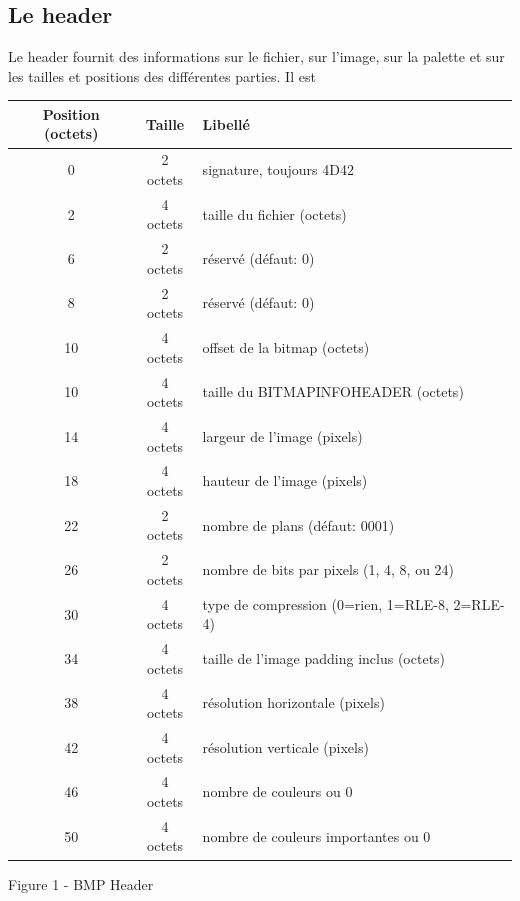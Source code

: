 \documentclass{article}
\begin{document}
		
		\subsection{Le header}
			Le header fournit des informations sur le fichier, sur l'image, sur la palette et sur les tailles et positions des différentes parties. Il est
			\begin{center}\begin{tabular}{|c|c|l|}
				\hline \textbf{Position (octets)} & \textbf{Taille} & \textbf{Libellé}\\
				\hline 0  & 2 octets & signature, toujours 4D42\\
				\hline 2  & 4 octets & taille du fichier (octets)\\
				\hline 6  & 2 octets & réservé (défaut: 0)\\
				\hline 8  & 2 octets & réservé (défaut: 0)\\
				\hline 10 & 4 octets & offset de la bitmap (octets)\\
				\hline 10 & 4 octets & taille du BITMAPINFOHEADER (octets)\\
				\hline 14 & 4 octets & largeur de l'image (pixels)\\
				\hline 18 & 4 octets & hauteur de l'image (pixels)\\
				\hline 22 & 2 octets & nombre de plans (défaut: 0001)\\
				\hline 26 & 2 octets & nombre de bits par pixels (1, 4, 8, ou 24)\\
				\hline 30 & 4 octets & type de compression (0=rien, 1=RLE-8, 2=RLE-4)\\
				\hline 34 & 4 octets & taille de l'image padding inclus (octets)\\
				\hline 38 & 4 octets & résolution horizontale (pixels)\\
				\hline 42 & 4 octets & résolution verticale (pixels)\\
				\hline 46 & 4 octets & nombre de couleurs ou 0\\
				\hline 50 & 4 octets & nombre de couleurs importantes ou 0\\
	
				\hline
			\end{tabular}\newline\newline Figure 1 - BMP Header\end{center}
		
\end{document}
